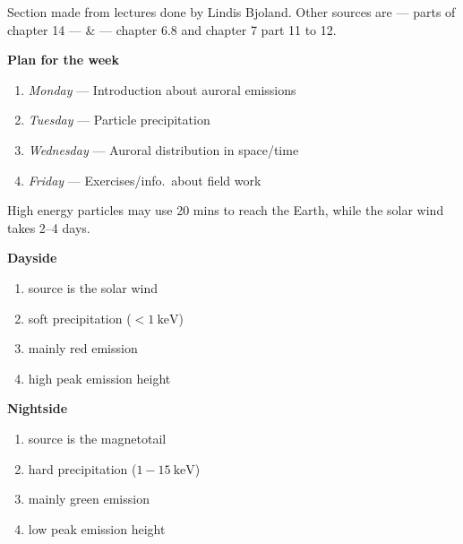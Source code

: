 \begin{remark}
    Section made from lectures done by Lindis Bjoland. Other sources are \citet{1995Itsp} --- parts of chapter 14 --- \& \citet{BrekkeAsgeir2013Potu} --- chapter 6.8 and chapter 7 part 11 to 12.
\end{remark}
\textbf{Plan for the week}
\begin{enumerate}[\(\bullet \)]
    \item \emph{Monday} --- Introduction about auroral emissions
    \item \emph{Tuesday} --- Particle precipitation
    \item \emph{Wednesday} --- Auroral distribution in space/time
    \item \emph{Friday} --- Exercises/info.\ about field work
\end{enumerate}
High energy particles may use 20 mins to reach the Earth, while the solar wind takes 2--4 days.\\

\begin{minipage}{.49\linewidth}
\textbf{Dayside}
    \begin{enumerate}[\(\triangleright \)]
    \item source is the solar wind
    \item soft precipitation (\(<\SI{1}{\kilo\electronvolt}\))
    \item mainly red emission
    \item high peak emission height
\end{enumerate}\end{minipage}
\begin{minipage}{.49\linewidth}
\textbf{Nightside}
\begin{enumerate}[\(\triangleright \)]
    \item source is the magnetotail
    \item hard precipitation (\(1-\SI{15}{\kilo\electronvolt}\))
    \item mainly green emission
    \item low peak emission height
\end{enumerate}\end{minipage}

